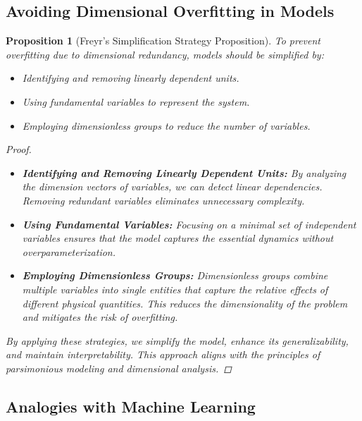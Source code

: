 \documentclass{article}
\newtheorem{proposition}{Proposition}[section]
\theoremstyle{definition}
\theoremstyle{remark}
\begin{document}
	\subsection{Avoiding Dimensional Overfitting in Models}
	
	\begin{proposition}[Freyr's Simplification Strategy Proposition]
		To prevent overfitting due to dimensional redundancy, models should be simplified by:
		\begin{itemize}
			\item Identifying and removing linearly dependent units.
			\item Using fundamental variables to represent the system.
			\item Employing dimensionless groups to reduce the number of variables.
		\end{itemize}
		
		\begin{proof}
			\begin{itemize}
				\item \textbf{Identifying and Removing Linearly Dependent Units:} By analyzing the dimension vectors of variables, we can detect linear dependencies. Removing redundant variables eliminates unnecessary complexity.
				
				\item \textbf{Using Fundamental Variables:} Focusing on a minimal set of independent variables ensures that the model captures the essential dynamics without overparameterization.
				
				\item \textbf{Employing Dimensionless Groups:} Dimensionless groups combine multiple variables into single entities that capture the relative effects of different physical quantities. This reduces the dimensionality of the problem and mitigates the risk of overfitting.
			\end{itemize}
			
			By applying these strategies, we simplify the model, enhance its generalizability, and maintain interpretability. This approach aligns with the principles of parsimonious modeling and dimensional analysis.
		\end{proof}
	\end{proposition}
	
	\subsection{Analogies with Machine Learning}
	
\end{document}
